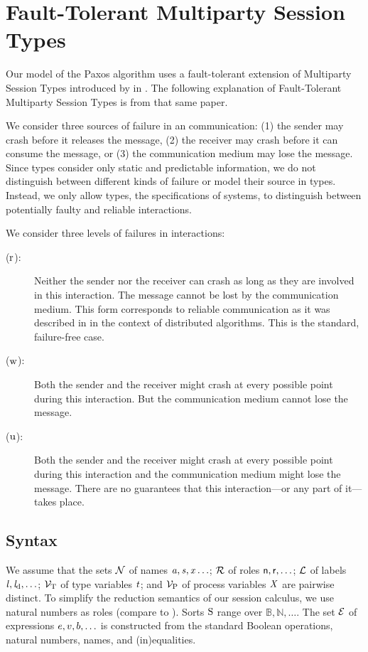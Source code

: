 \section{Fault-Tolerant Multiparty Session Types}
Our model of the Paxos algorithm uses a fault-tolerant extension of Multiparty Session Types introduced by \citeauthor{PetersEtal21} in \cite{PetersEtal21}.
The following explanation of Fault-Tolerant Multiparty Session Types is from that same paper.

We consider three sources of failure in an \unrel communication:
(1) the sender may crash before it releases the message,
(2) the receiver may crash before it can consume the message, or
(3) the communication medium may lose the message.
Since types consider only static and predictable information, we do not distinguish between different kinds of failure or model their source in types.
Instead, we only allow types, \ie the specifications of systems, to distinguish between potentially faulty and reliable interactions.

We consider three levels of failures in interactions:
\begin{description}
	\item[\StrongR ($ \iR $):] Neither the sender nor the receiver can crash as long as they are involved in this interaction. The message cannot be lost by the communication medium. This form corresponds to reliable communication as it was described in \cite{AguileraChenToueg97} in the context of distributed algorithms.
		This is the standard, failure-free case.
	\item[\WeakR ($ \iW $):] Both the sender and the receiver might crash at every possible point during this interaction. But the communication medium cannot lose the message.
	\item[\Unrel ($ \iU $):] Both the sender and the receiver might crash at every possible point during this interaction and the communication medium might lose the message. There are no guarantees that this interaction---or any part of it---takes place.
\end{description}

\subsection{Syntax} %

We assume that the sets $ \names $ of names $ \Chan[a], \Chan, \Args \ldots $; $ \roles $ of roles $ \Role[n], \Role, \ldots $; $ \labels $ of labels $ \Label, \LabelD, \ldots $; $ \typeVars $ of type variables $ \TypeV $; and $ \procVars $ of process variables $ \ProcV $ are pairwise distinct.
To simplify the reduction semantics of our session calculus, we use natural numbers as roles (compare to \cite{hondaYoshidaCarbone16}).
Sorts $ \Sort $ range over $ \mathbb{B}, \mathbb{N}, \ldots $.
The set $ \expressions $ of expressions $ \Expr, \Expr[v], \Expr[b], \ldots $ is constructed from the standard Boolean operations, natural numbers, names, and (in)equalities.

